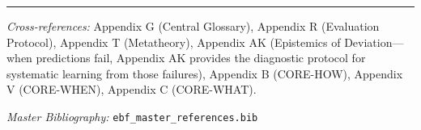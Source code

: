 
\vspace{1em}
\hrule
\vspace{0.5em}

\noindent\textit{Cross-references:}
Appendix G (Central Glossary),
Appendix R (Evaluation Protocol),
Appendix T (Metatheory),
Appendix AK (Epistemics of Deviation---when predictions fail, Appendix AK provides the diagnostic protocol for systematic learning from those failures),
Appendix B (CORE-HOW),
Appendix V (CORE-WHEN),
Appendix C (CORE-WHAT).

\noindent\textit{Master Bibliography:} \texttt{ebf\_master\_references.bib}

